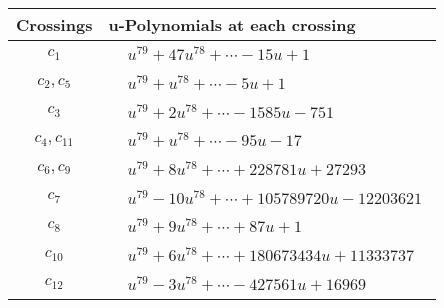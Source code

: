 \documentclass[1p]{elsarticle_modified}
\theoremstyle{definition}
\begin{document}
\begin{tabular}{m{50pt}|m{274pt}}
Crossings & \hspace{64pt}u-Polynomials at each crossing \\
\hline $$\begin{aligned}c_{1}\end{aligned}$$&$\begin{aligned}
&u^{79}+47 u^{78}+\cdots-15 u+1
\end{aligned}$\\
\hline $$\begin{aligned}c_{2},c_{5}\end{aligned}$$&$\begin{aligned}
&u^{79}+u^{78}+\cdots-5 u+1
\end{aligned}$\\
\hline $$\begin{aligned}c_{3}\end{aligned}$$&$\begin{aligned}
&u^{79}+2 u^{78}+\cdots-1585 u-751
\end{aligned}$\\
\hline $$\begin{aligned}c_{4},c_{11}\end{aligned}$$&$\begin{aligned}
&u^{79}+u^{78}+\cdots-95 u-17
\end{aligned}$\\
\hline $$\begin{aligned}c_{6},c_{9}\end{aligned}$$&$\begin{aligned}
&u^{79}+8 u^{78}+\cdots+228781 u+27293
\end{aligned}$\\
\hline $$\begin{aligned}c_{7}\end{aligned}$$&$\begin{aligned}
&u^{79}-10 u^{78}+\cdots+105789720 u-12203621
\end{aligned}$\\
\hline $$\begin{aligned}c_{8}\end{aligned}$$&$\begin{aligned}
&u^{79}+9 u^{78}+\cdots+87 u+1
\end{aligned}$\\
\hline $$\begin{aligned}c_{10}\end{aligned}$$&$\begin{aligned}
&u^{79}+6 u^{78}+\cdots+180673434 u+11333737
\end{aligned}$\\
\hline $$\begin{aligned}c_{12}\end{aligned}$$&$\begin{aligned}
&u^{79}-3 u^{78}+\cdots-427561 u+16969
\end{aligned}$\\
\hline
\end{tabular}\\~\\
\end{document}
